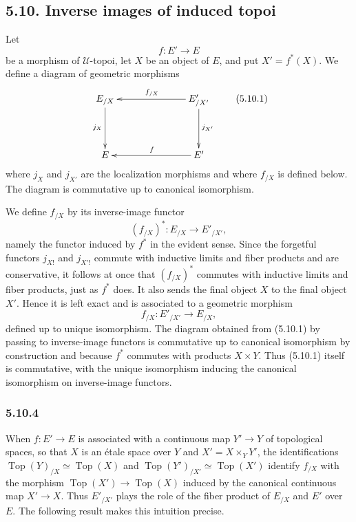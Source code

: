 \documentclass[11pt]{article}
\newcommand{\U}{\mathcal{U}}
\newcommand{\Top}{\operatorname{Top}}
\begin{document}
\subsection*{5.10. Inverse images of induced topoi}
Let
\[
f:E'\longrightarrow E
\]
be a morphism of \(\U\)-topoi, let \(X\) be an object of \(E\), and put \(X'=f^*(X)\). We define a diagram of geometric morphisms
\[
\xymatrix@C=2.5cm@R=1.5cm{E_{/X} \ar[d]_{j_X} & E'_{/X'}\ar[l]_{f_{/X}}\ar[d]^{j_{X'}}\\
E & E'\ar[l]_f}
\tag{5.10.1}
\]
where \(j_X\) and \(j_{X'}\) are the localization morphisms and where \(f_{/X}\) is defined below. The diagram is commutative up to canonical isomorphism.

We define \(f_{/X}\) by its inverse-image functor
\begin{equation*}
(f_{/X})^*:E_{/X}\longrightarrow E'_{/X'},\tag{5.10.2}
\end{equation*}
namely the functor induced by \(f^*\) in the evident sense. Since the forgetful functors \(j_{X!}\) and \(j_{X'!}\) commute with inductive limits and fiber products and are conservative, it follows at once that \((f_{/X})^*\) commutes with inductive limits and fiber products, just as \(f^*\) does. It also sends the final object \(X\) to the final object \(X'\). Hence it is left exact and is associated to a geometric morphism
\begin{equation*}
f_{/X}:E'_{/X'}\longrightarrow E_{/X},\tag{5.10.3}
\end{equation*}
defined up to unique isomorphism. The diagram obtained from (5.10.1) by passing to inverse-image functors is commutative up to canonical isomorphism by construction and because \(f^*\) commutes with products \(X\times Y\). Thus (5.10.1) itself is commutative, with the unique isomorphism inducing the canonical isomorphism on inverse-image functors.

\subsubsection*{5.10.4}
When \(f:E'\to E\) is associated with a continuous map \(Y'\to Y\) of topological spaces, so that \(X\) is an \'etale space over \(Y\) and \(X'=X\times_Y Y'\), the identifications \(\Top(Y)_{/X}\simeq\Top(X)\) and \(\Top(Y')_{/X'}\simeq\Top(X')\) identify \(f_{/X}\) with the morphism \(\Top(X')\to\Top(X)\) induced by the canonical continuous map \(X'\to X\). Thus \(E'_{/X'}\) plays the role of the fiber product of \(E_{/X}\) and \(E'\) over \(E\). The following result makes this intuition precise.
\end{document}
